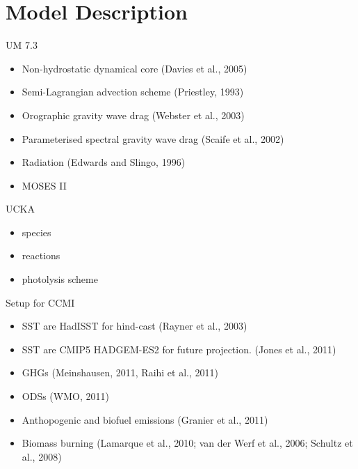 \section{Model Description}

UM 7.3
\begin{itemize}
\item Non-hydrostatic dynamical core (Davies et al., 2005)
\item Semi-Lagrangian advection scheme (Priestley, 1993)
\item Orographic gravity wave drag (Webster et al., 2003)
\item Parameterised spectral gravity wave drag (Scaife et al., 2002)
\item Radiation (Edwards and Slingo, 1996)
\item MOSES II
\end{itemize}
UCKA
\begin{itemize}
\item species
\item reactions
\item photolysis scheme
\end{itemize}
Setup for CCMI
\begin{itemize}
\item SST are HadISST for hind-cast (Rayner et al., 2003)
\item SST are CMIP5 HADGEM-ES2 for future projection. (Jones et al., 2011)
\item GHGs (Meinshausen, 2011, Raihi et al., 2011)
\item ODSs (WMO, 2011)
\item Anthopogenic and biofuel emissions (Granier et al., 2011)
\item Biomass burning (Lamarque et al., 2010; van der Werf et al., 2006; Schultz et al., 2008)
\end{itemize}

\begin{itemize}


\end{itemize}

